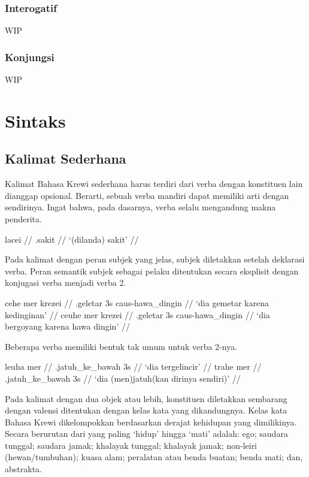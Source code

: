 \documentclass[12pt,oneside]{book}
\begin{document}
\subsection{Interogatif}
WIP

\subsection{Konjungsi}
WIP


\chapter{Sintaks}
\section{Kalimat Sederhana}
Kalimat Bahasa Krewi sederhana harus terdiri dari verba dengan konstituen lain dianggap opsional. Berarti, sebuah verba mandiri dapat memiliki arti dengan sendirinya. Ingat bahwa, pada dasarnya, verba selalu mengandung makna penderita.

\ex
\begingl
\gla lacei //
.sakit // 
\glft `(dilanda) sakit' //
\endgl
\xe

Pada kalimat dengan peran subjek yang jelas, subjek diletakkan setelah deklarasi verba. Peran semantik subjek sebagai pelaku ditentukan secara eksplisit dengan konjugasi verba menjadi verba 2.

\pex
\a
\begingl
\gla cehe mer krezei //
.geletar {\sc 3s} {\sc caus}-hawa\_dingin //
\glft `dia gemetar karena kedinginan' //
\endgl
\a
\begingl
\gla ceuhe mer krezei //
.geletar {\sc 3s} {\sc caus}-hawa\_dingin //
\glft `dia bergoyang karena hawa dingin' //
\endgl
\xe

Beberapa verba memiliki bentuk tak umum untuk verba 2-nya.

\pex
\a
\begingl
\gla leuha mer //
.jatuh\_ke\_bawah {\sc 3s} //
\glft `dia tergelincir' //
\endgl
\a
\begingl
\gla trahe mer //
.jatuh\_ke\_bawah {\sc 3s} //
\glft `dia (men)jatuh(kan dirinya sendiri)' //
\endgl
\xe

Pada kalimat dengan dua objek atau lebih, konstituen diletakkan sembarang dengan valensi ditentukan dengan kelas kata yang dikandungnya. Kelas kata Bahasa Krewi dikelompokkan berdasarkan derajat kehidupan yang dimilikinya. Secara berurutan dari yang paling `hidup' hingga `mati' adalah: ego; saudara tunggal; saudara jamak; khalayak tunggal; khalayak jamak; non-leiri (hewan/tumbuhan); kuasa alam; peralatan atau benda buatan; benda mati; dan, abstrakta.
\end{document}
